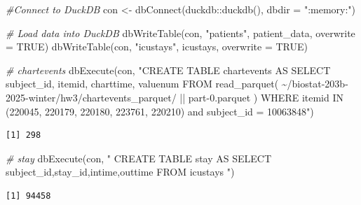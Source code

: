 \documentclass[
]{article}
\newenvironment{Shaded}{\begin{snugshade}}{\end{snugshade}}
\newcommand{\AttributeTok}[1]{\textcolor[rgb]{0.77,0.63,0.00}{#1}}
\newcommand{\CommentTok}[1]{\textcolor[rgb]{0.56,0.35,0.01}{\textit{#1}}}
\newcommand{\ConstantTok}[1]{\textcolor[rgb]{0.00,0.00,0.00}{#1}}
\newcommand{\FunctionTok}[1]{\textcolor[rgb]{0.00,0.00,0.00}{#1}}
\newcommand{\NormalTok}[1]{\textcolor[rgb]{0.00,0.00,0.00}{#1}}
\newcommand{\OtherTok}[1]{\textcolor[rgb]{0.56,0.35,0.01}{#1}}
\newcommand{\SpecialCharTok}[1]{\textcolor[rgb]{0.00,0.00,0.00}{#1}}
\newcommand{\StringTok}[1]{\textcolor[rgb]{0.31,0.60,0.02}{#1}}
\begin{document}
\begin{Shaded}
\begin{Highlighting}[]
\CommentTok{\#Connect to DuckDB}
\NormalTok{con }\OtherTok{\textless{}{-}} \FunctionTok{dbConnect}\NormalTok{(duckdb}\SpecialCharTok{::}\FunctionTok{duckdb}\NormalTok{(), }\AttributeTok{dbdir =} \StringTok{":memory:"}\NormalTok{)}

\CommentTok{\#  Load \textasciigrave{}data\textasciigrave{} into DuckDB}
\FunctionTok{dbWriteTable}\NormalTok{(con, }\StringTok{"patients"}\NormalTok{, patient\_data, }\AttributeTok{overwrite =} \ConstantTok{TRUE}\NormalTok{)}
\FunctionTok{dbWriteTable}\NormalTok{(con, }\StringTok{"icustays"}\NormalTok{, icustays, }\AttributeTok{overwrite =} \ConstantTok{TRUE}\NormalTok{)}
\end{Highlighting}
\end{Shaded}

\begin{Shaded}
\begin{Highlighting}[]
\CommentTok{\# chartevents}
\FunctionTok{dbExecute}\NormalTok{(con, }\StringTok{"CREATE TABLE chartevents AS }
\StringTok{                SELECT subject\_id, itemid, charttime, valuenum }
\StringTok{                FROM read\_parquet(}
\StringTok{    \textquotesingle{}\textasciitilde{}/biostat{-}203b{-}2025{-}winter/hw3/chartevents\_parquet/\textquotesingle{} || }
\StringTok{    \textquotesingle{}part{-}0.parquet\textquotesingle{}}
\StringTok{  )}
\StringTok{                WHERE itemid IN (220045, 220179, 220180, 223761, 220210) and }
\StringTok{                subject\_id = 10063848"}\NormalTok{)}
\end{Highlighting}
\end{Shaded}

\begin{verbatim}
[1] 298
\end{verbatim}

\begin{Shaded}
\begin{Highlighting}[]
\CommentTok{\# stay }
\FunctionTok{dbExecute}\NormalTok{(con, }\StringTok{"}
\StringTok{  CREATE TABLE stay AS}
\StringTok{  SELECT subject\_id,stay\_id,intime,outtime}
\StringTok{  FROM icustays}
\StringTok{"}\NormalTok{)}
\end{Highlighting}
\end{Shaded}

\begin{verbatim}
[1] 94458
\end{verbatim}
\end{document}
